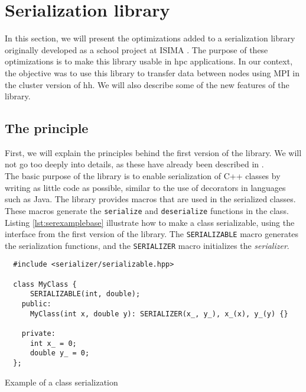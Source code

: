 
\clearpage{}
\section{Serialization library}

In this section, we will present the optimizations added to a serialization
library originally developed as a school project at ISIMA
\cite{projectzz3isima}. The purpose of these optimizations is to make this
library usable in \gls{hpc} applications. In our context, the objective was to
use this library to transfer data between nodes using MPI in the cluster
version of \gls{hh}. We will also describe some of the new features of the
library.

\subsection{The principle}

First, we will explain the principles behind the first version of the
library. We will not go too deeply into details, as these have already been
described in \cite{projectzz3isima}.\\

The basic purpose of the library is to enable serialization of C++ classes by
writing as little code as possible, similar to the use of decorators in
languages such as Java. The library provides macros that are used in the
serialized classes. These macros generate the \texttt{serialize} and
\texttt{deserialize} functions in the class. Listing \ref{lst:serexamplebase}
illustrate how to make a class serializable, using the interface from the first
version of the library. The \texttt{SERIALIZABLE} macro generates the
serialization functions, and the \texttt{SERIALIZER} macro initializes the
\textit{serializer}.

\begin{listing}[ht!]
\begin{verbatim}
  #include <serializer/serializable.hpp>

  class MyClass {
      SERIALIZABLE(int, double);
    public:
      MyClass(int x, double y): SERIALIZER(x_, y_), x_(x), y_(y) {}

    private:
      int x_ = 0;
      double y_ = 0;
  };
\end{verbatim}
\caption{Example of a class serialization}
\label{lst:serexamplebase}
\end{listing}

